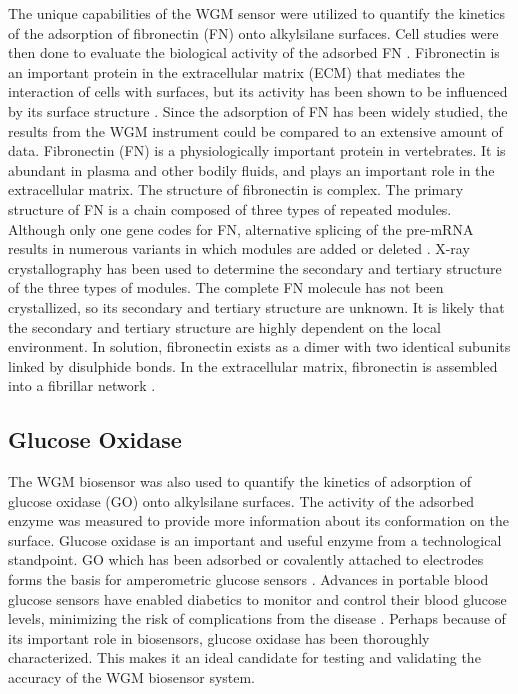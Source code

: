 The unique capabilities of the WGM sensor were utilized to quantify
the kinetics of the adsorption of fibronectin (FN) onto alkylsilane
surfaces. Cell studies were then done to evaluate the biological activity
of the adsorbed FN \cite{Keselowsky2004}. Fibronectin is an important
protein in the extracellular matrix (ECM) that mediates the interaction
of cells with surfaces, but its activity has been shown to be influenced
by its surface structure \cite{Lan2005,Michael2003}. Since the adsorption
of FN has been widely studied, the results from the WGM instrument
could be compared to an extensive amount of data. Fibronectin (FN)
is a physiologically important protein in vertebrates. It is abundant
in plasma and other bodily fluids, and plays an important role in
the extracellular matrix. The structure of fibronectin is complex.
The primary structure of FN is a chain composed of three types of
repeated modules. Although only one gene codes for FN, alternative
splicing of the pre-mRNA results in numerous variants in which modules
are added or deleted \cite{Pankov2002}. X-ray crystallography has
been used to determine the secondary and tertiary structure of the
three types of modules. The complete FN molecule has not been crystallized,
so its secondary and tertiary structure are unknown. It is likely
that the secondary and tertiary structure are highly dependent on
the local environment. In solution, fibronectin exists as a dimer
with two identical subunits linked by disulphide bonds. In the extracellular
matrix, fibronectin is assembled into a fibrillar network \cite{Mao2005}.


\subsection{Glucose Oxidase}

The WGM biosensor was also used to quantify the kinetics of adsorption
of glucose oxidase (GO) onto alkylsilane surfaces. The activity of
the adsorbed enzyme was measured to provide more information about
its conformation on the surface. Glucose oxidase is an important and
useful enzyme from a technological standpoint. GO which has been adsorbed
or covalently attached to electrodes forms the basis for amperometric
glucose sensors \cite{Wang2007}. Advances in portable blood glucose
sensors have enabled diabetics to monitor and control their blood
glucose levels, minimizing the risk of complications from the disease
\cite{Oliver2009}. Perhaps because of its important role in biosensors,
glucose oxidase has been thoroughly characterized. This makes it an
ideal candidate for testing and validating the accuracy of the WGM
biosensor system. 

